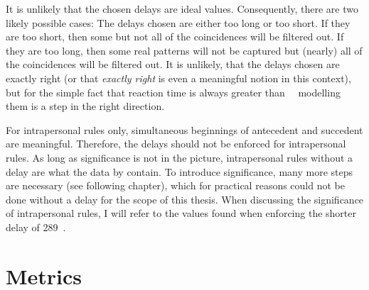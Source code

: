 It is unlikely that the chosen delays are ideal values.
Consequently, there are two likely possible cases:
The delays chosen are either too long or too short.
If they are too short, then some but not all of the coincidences will be filtered out.
If they are too long, then some real patterns will not be captured but (nearly) all of the coincidences will be filtered out.
It is unlikely, that the delays chosen are exactly right (or that \emph{exactly right} is even a meaningful notion in this context), but for the simple fact that reaction time is always greater than \zero~\ms\ modelling them is a step in the right direction.

For intrapersonal rules only, simultaneous beginnings of antecedent and succedent are meaningful.
Therefore, the delays should not be enforced for intrapersonal rules.
As long as significance is not in the picture, intrapersonal rules without a delay are what the data by \citet{rohlfing_multimodal_underreview} contain.
To introduce significance, many more steps are necessary (see following chapter), which for practical reasons could not be done without a delay for the scope of this thesis.
When discussing the significance of intrapersonal rules, I will refer to the values found when enforcing the shorter delay of 289~\ms.


\section{Metrics}
\label{sec:fpmmetr}
